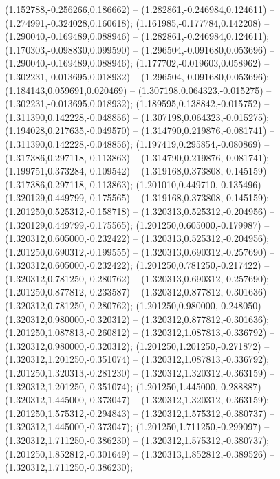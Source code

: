  (1.152788,-0.256266,0.186662) -- (1.282861,-0.246984,0.124611) -- (1.274991,-0.324028,0.160618);
 (1.161985,-0.177784,0.142208) -- (1.290040,-0.169489,0.088946) -- (1.282861,-0.246984,0.124611);
 (1.170303,-0.098830,0.099590) -- (1.296504,-0.091680,0.053696) -- (1.290040,-0.169489,0.088946);
 (1.177702,-0.019603,0.058962) -- (1.302231,-0.013695,0.018932) -- (1.296504,-0.091680,0.053696);
 (1.184143,0.059691,0.020469) -- (1.307198,0.064323,-0.015275) -- (1.302231,-0.013695,0.018932);
 (1.189595,0.138842,-0.015752) -- (1.311390,0.142228,-0.048856) -- (1.307198,0.064323,-0.015275);
 (1.194028,0.217635,-0.049570) -- (1.314790,0.219876,-0.081741) -- (1.311390,0.142228,-0.048856);
 (1.197419,0.295854,-0.080869) -- (1.317386,0.297118,-0.113863) -- (1.314790,0.219876,-0.081741);
 (1.199751,0.373284,-0.109542) -- (1.319168,0.373808,-0.145159) -- (1.317386,0.297118,-0.113863);
 (1.201010,0.449710,-0.135496) -- (1.320129,0.449799,-0.175565) -- (1.319168,0.373808,-0.145159);
 (1.201250,0.525312,-0.158718) -- (1.320313,0.525312,-0.204956) -- (1.320129,0.449799,-0.175565);
 (1.201250,0.605000,-0.179987) -- (1.320312,0.605000,-0.232422) -- (1.320313,0.525312,-0.204956);
 (1.201250,0.690312,-0.199555) -- (1.320313,0.690312,-0.257690) -- (1.320312,0.605000,-0.232422);
 (1.201250,0.781250,-0.217422) -- (1.320312,0.781250,-0.280762) -- (1.320313,0.690312,-0.257690);
 (1.201250,0.877812,-0.233587) -- (1.320312,0.877812,-0.301636) -- (1.320312,0.781250,-0.280762);
 (1.201250,0.980000,-0.248050) -- (1.320312,0.980000,-0.320312) -- (1.320312,0.877812,-0.301636);
 (1.201250,1.087813,-0.260812) -- (1.320312,1.087813,-0.336792) -- (1.320312,0.980000,-0.320312);
 (1.201250,1.201250,-0.271872) -- (1.320312,1.201250,-0.351074) -- (1.320312,1.087813,-0.336792);
 (1.201250,1.320313,-0.281230) -- (1.320312,1.320312,-0.363159) -- (1.320312,1.201250,-0.351074);
 (1.201250,1.445000,-0.288887) -- (1.320312,1.445000,-0.373047) -- (1.320312,1.320312,-0.363159);
 (1.201250,1.575312,-0.294843) -- (1.320312,1.575312,-0.380737) -- (1.320312,1.445000,-0.373047);
 (1.201250,1.711250,-0.299097) -- (1.320312,1.711250,-0.386230) -- (1.320312,1.575312,-0.380737);
 (1.201250,1.852812,-0.301649) -- (1.320313,1.852812,-0.389526) -- (1.320312,1.711250,-0.386230);
